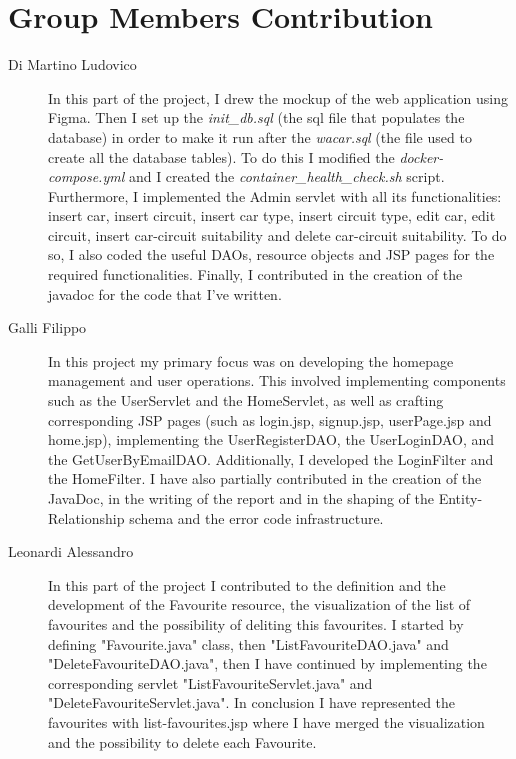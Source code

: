 \section{Group Members Contribution}


\begin{description}
	\item[Di Martino Ludovico] In this part of the project, I drew the mockup of the web application using Figma. Then I set up the \textit{init\_db.sql} (the sql file that populates the database) in order to make it run after the \textit{wacar.sql} (the file used to create all the database tables). To do this I modified the \textit{docker-compose.yml} and I created the \textit{container\_health\_check.sh} script. Furthermore, I implemented the Admin servlet with all its functionalities: insert car, insert circuit, insert car type, insert circuit type, edit car, edit circuit, insert car-circuit suitability and delete car-circuit suitability. To do so, I also coded the useful DAOs, resource objects and JSP pages for the required functionalities. Finally, I contributed in the creation of the javadoc for the code that I've written.
	\item[Galli Filippo] In this project my primary focus was on developing the homepage management and user operations. This involved implementing components such as the UserServlet and the HomeServlet, as well as crafting corresponding JSP pages (such as login.jsp, signup.jsp, userPage.jsp and home.jsp), implementing the UserRegisterDAO, the UserLoginDAO, and the GetUserByEmailDAO. Additionally, I developed the LoginFilter and the HomeFilter. I have also partially contributed in the creation of the JavaDoc, in the writing of the report and in the shaping of the Entity-Relationship schema and the error code infrastructure.
	\item[Leonardi Alessandro] In this part of the project I contributed to the definition and the development of the Favourite resource, the visualization of the list of favourites and the possibility of deliting this favourites. I started by defining "Favourite.java" class, then "ListFavouriteDAO.java" and "DeleteFavouriteDAO.java", then I have continued by implementing the corresponding servlet "ListFavouriteServlet.java" and "DeleteFavouriteServlet.java". In conclusion I have represented the favourites with list-favourites.jsp where I have merged the visualization and the possibility to delete each Favourite. 

\end{description}
